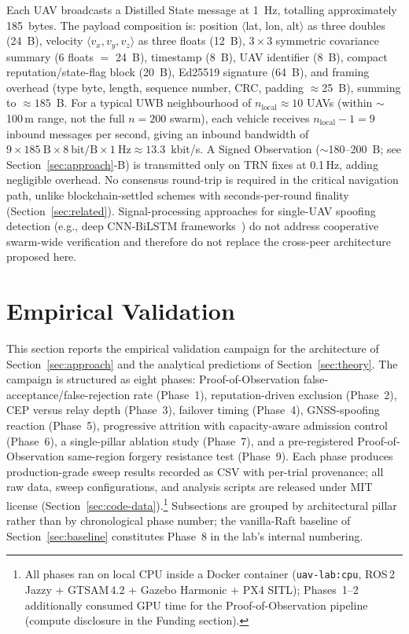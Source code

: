 \documentclass[journal,10pt,twocolumn]{IEEEtran}
\begin{document}
Each UAV broadcasts a Distilled State message at 1~Hz, totalling approximately 185~bytes. The payload composition is: position $\langle$lat, lon, alt$\rangle$ as three doubles (24~B), velocity $\langle v_x, v_y, v_z\rangle$ as three floats (12~B), $3{\times}3$ symmetric covariance summary (6 floats $=$ 24~B), timestamp (8~B), UAV identifier (8~B), compact reputation/state-flag block (20~B), Ed25519 signature (64~B), and framing overhead (type byte, length, sequence number, CRC, padding $\approx$25~B), summing to $\approx 185$~B. For a typical UWB neighbourhood of $n_\text{local}\approx 10$ UAVs (within $\sim$100\,m range, not the full $n=200$ swarm), each vehicle receives $n_\text{local}-1 = 9$ inbound messages per second, giving an inbound bandwidth of $9 \times 185~\text{B} \times 8~\text{bit/B} \times 1~\text{Hz} \approx 13.3$~kbit/s. A Signed Observation ($\sim$180--200~B; see Section~\ref{sec:approach}-B) is transmitted only on TRN fixes at 0.1\,Hz, adding negligible overhead. No consensus round-trip is required in the critical navigation path, unlike blockchain-settled schemes with seconds-per-round finality (Section~\ref{sec:related}). Signal-processing approaches for single-UAV spoofing detection (e.g., deep CNN-BiLSTM frameworks~\cite{badar2025deepspoofnet}) do not address cooperative swarm-wide verification and therefore do not replace the cross-peer architecture proposed here.

\section{Empirical Validation}
\label{sec:empirical}
\label{sec:sim}

This section reports the empirical validation campaign for the architecture of Section~\ref{sec:approach} and the analytical predictions of Section~\ref{sec:theory}. The campaign is structured as eight phases: Proof-of-Observation false-acceptance/false-rejection rate (Phase~1), reputation-driven exclusion (Phase~2), CEP versus relay depth (Phase~3), failover timing (Phase~4), GNSS-spoofing reaction (Phase~5), progressive attrition with capacity-aware admission control (Phase~6), a single-pillar ablation study (Phase~7), and a pre-registered Proof-of-Observation same-region forgery resistance test (Phase~9). Each phase produces production-grade sweep results recorded as CSV with per-trial provenance; all raw data, sweep configurations, and analysis scripts are released under MIT license (Section~\ref{sec:code-data}).\footnote{All phases ran on local CPU inside a Docker container (\texttt{uav-lab:cpu}, ROS\,2 Jazzy + GTSAM\,4.2 + Gazebo Harmonic + PX4 SITL); Phases~1--2 additionally consumed GPU time for the Proof-of-Observation pipeline (compute disclosure in the Funding section).} Subsections are grouped by architectural pillar rather than by chronological phase number; the vanilla-Raft baseline of Section~\ref{sec:baseline} constitutes Phase~8 in the lab's internal numbering.
\end{document}
